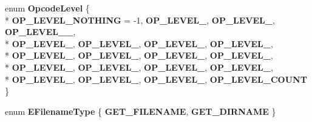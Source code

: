 \begin{DoxyCompactItemize}
\item 
enum {\bfseries Opcode\+Level} \{ \\*
{\bfseries O\+P\+\_\+\+L\+E\+V\+E\+L\+\_\+\+N\+O\+T\+H\+I\+NG} = -\/1, 
{\bfseries O\+P\+\_\+\+L\+E\+V\+E\+L\+\_}, 
{\bfseries O\+P\+\_\+\+L\+E\+V\+E\+L\+\_}, 
{\bfseries O\+P\+\_\+\+L\+E\+V\+E\+L\+\_\+\_}, 
\\*
{\bfseries O\+P\+\_\+\+L\+E\+V\+E\+L\+\_}, 
{\bfseries O\+P\+\_\+\+L\+E\+V\+E\+L\+\_}, 
{\bfseries O\+P\+\_\+\+L\+E\+V\+E\+L\+\_}, 
{\bfseries O\+P\+\_\+\+L\+E\+V\+E\+L\+\_}, 
\\*
{\bfseries O\+P\+\_\+\+L\+E\+V\+E\+L\+\_}, 
{\bfseries O\+P\+\_\+\+L\+E\+V\+E\+L\+\_}, 
{\bfseries O\+P\+\_\+\+L\+E\+V\+E\+L\+\_}, 
{\bfseries O\+P\+\_\+\+L\+E\+V\+E\+L\+\_}, 
\\*
{\bfseries O\+P\+\_\+\+L\+E\+V\+E\+L\+\_}, 
{\bfseries O\+P\+\_\+\+L\+E\+V\+E\+L\+\_}, 
{\bfseries O\+P\+\_\+\+L\+E\+V\+E\+L\+\_}, 
{\bfseries O\+P\+\_\+\+L\+E\+V\+E\+L\+\_}, 
\\*
{\bfseries O\+P\+\_\+\+L\+E\+V\+E\+L\+\_}, 
{\bfseries O\+P\+\_\+\+L\+E\+V\+E\+L\+\_}, 
{\bfseries O\+P\+\_\+\+L\+E\+V\+E\+L\+\_}, 
{\bfseries O\+P\+\_\+\+L\+E\+V\+E\+L\+\_\+\+C\+O\+U\+NT}
 \}\hypertarget{class_object_script_1_1_o_s_1_1_core_1_1_compiler_a88ea744c9c65d7365b7e6827ddb62beb}{}\label{class_object_script_1_1_o_s_1_1_core_1_1_compiler_a88ea744c9c65d7365b7e6827ddb62beb}

\item 
enum {\bfseries E\+Filename\+Type} \{ {\bfseries G\+E\+T\+\_\+\+F\+I\+L\+E\+N\+A\+ME}, 
{\bfseries G\+E\+T\+\_\+\+D\+I\+R\+N\+A\+ME}
 \}\hypertarget{class_object_script_1_1_o_s_1_1_core_1_1_compiler_ab9c8294c80cfdad9482d00e1421c666b}{}\label{class_object_script_1_1_o_s_1_1_core_1_1_compiler_ab9c8294c80cfdad9482d00e1421c666b}

\end{DoxyCompactItemize}
